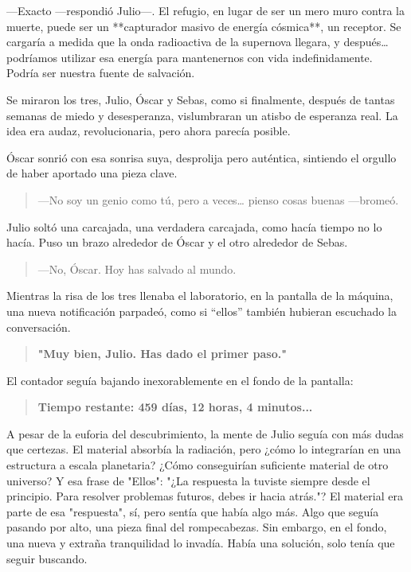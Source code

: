 \documentclass[a4paper,12pt]{book}
\begin{document}
—Exacto —respondió Julio—. El refugio, en lugar de ser un mero muro contra la muerte, puede ser un **capturador masivo de energía cósmica**, un receptor. Se cargaría a medida que la onda radioactiva de la supernova llegara, y después… podríamos utilizar esa energía para mantenernos con vida indefinidamente. Podría ser nuestra fuente de salvación.

Se miraron los tres, Julio, Óscar y Sebas, como si finalmente, después de tantas semanas de miedo y desesperanza, vislumbraran un atisbo de esperanza real. La idea era audaz, revolucionaria, pero ahora parecía posible.

Óscar sonrió con esa sonrisa suya, desprolija pero auténtica, sintiendo el orgullo de haber aportado una pieza clave.

\begin{quote}
    —No soy un genio como tú, pero a veces… pienso cosas buenas —bromeó.
\end{quote}

Julio soltó una carcajada, una verdadera carcajada, como hacía tiempo no lo hacía. Puso un brazo alrededor de Óscar y el otro alrededor de Sebas.

\begin{quote}
    —No, Óscar. Hoy has salvado al mundo.
\end{quote}

Mientras la risa de los tres llenaba el laboratorio, en la pantalla de la máquina, una nueva notificación parpadeó, como si “ellos” también hubieran escuchado la conversación.

\begin{quote}
    \textbf{"Muy bien, Julio. Has dado el primer paso."}
\end{quote}

El contador seguía bajando inexorablemente en el fondo de la pantalla:

\begin{quote}
    \textbf{Tiempo restante: 459 días, 12 horas, 4 minutos...}
\end{quote}

A pesar de la euforia del descubrimiento, la mente de Julio seguía con más dudas que certezas. El material absorbía la radiación, pero ¿cómo lo integrarían en una estructura a escala planetaria? ¿Cómo conseguirían suficiente material de otro universo? Y esa frase de "Ellos": "¿La respuesta la tuviste siempre desde el principio. Para resolver problemas futuros, debes ir hacia atrás."? El material era parte de esa "respuesta", sí, pero sentía que había algo más. Algo que seguía pasando por alto, una pieza final del rompecabezas. Sin embargo, en el fondo, una nueva y extraña tranquilidad lo invadía. Había una solución, solo tenía que seguir buscando.
\end{document}
